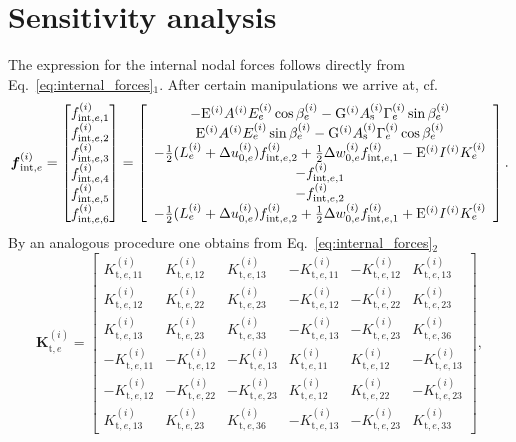 \documentclass[11pt]{article}
\newcommand{\Eref}[1]{Eq.~\eqref{#1}}
\newcommand{\M}[1]{{\boldsymbol #1}}
\newcommand{\lay}[1]{^{(#1)}}
\newcommand{\Duc}[2]{\Delta u_{0,#2}\lay{#1}}
\newcommand{\Dwc}[2]{\Delta w_{0,#2}\lay{#1}}
\newcommand{\Sc}[1]{E\lay{#1}}
\newcommand{\Kc}[1]{K\lay{#1}}
\newcommand{\Gc}[1]{\Gamma\lay{#1}}
\newcommand{\half}{\mbox{$\frac{1}{2}$}}
\newcommand{\E}[1]{\mathrm{E}\lay{#1}}\newcommand{\G}[1]{\mathrm{G}\lay{#1}}\newcommand{\A}[1]{A\lay{#1}}\newcommand{\I}[1]{I\lay{#1}}\newcommand{\As}[1]{A_\mathrm{s}\lay{#1}}
\newcommand{\el}{e}
\newcommand{\Mfinte}[1]{\M{f}_{\mathrm{int},#1}}
\newcommand{\finte}[1]{f_{\mathrm{int},#1}}
\newcommand{\Kt}[1]{K_{\mathrm{t},#1}}
\begin{document}
\appendix

\section{Sensitivity analysis}\label{app:sensitivity_analysis}

The expression for the internal nodal forces follows directly from
\Eref{eq:internal_forces}$_1$. After certain manipulations
we arrive at, cf.~\cite{Kucerova:2003:DEA}
\begin{equation}
\Mfinte{\el}\lay{i}
=
\begin{bmatrix}
\finte{e,1}\lay{i} \\
\finte{e,2}\lay{i} \\
\finte{e,3}\lay{i} \\
\finte{e,4}\lay{i} \\
\finte{e,5}\lay{i} \\
\finte{e,6}\lay{i} 
\end{bmatrix}
=
\left[
\begin{array}{c}
- \E{i} \A{i} \Sc{i}_\el \cos\beta\lay{i}_\el 
- \G{i} \As{i} \Gc{i}_\el \sin\beta\lay{i}_\el  \\
  \E{i} \A{i} \Sc{i}_\el \sin\beta\lay{i}_\el 
- \G{i} \As{i} \Gc{i}_\el \cos\beta\lay{i}_\el \\
- \half (\eL{\el}{i} + \Duc{i}{\el})
  \finte{e,2}\lay{i} 
+ \half \Dwc{i}{\el} \finte{e,1}\lay{i} 
- \E{i} \I{i} \Kc{i}_\el
\\ 
- \finte{e,1}\lay{i} \\
- \finte{e,2}\lay{i} \\
- \half (\eL{\el}{i} + \Duc{i}{\el} )
\finte{e,2}\lay{i} 
+ \half \Dwc{i}{\el}\finte{e,1}\lay{i} 
+ 
\E{i} \I{i} \Kc{i}_\el 
\end{array}
\right].
\label{eq:f_int_e}
\end{equation}
By an analogous procedure one obtains from \Eref{eq:internal_forces}$_2$ 
\begin{equation}
\M{K}_{\mathrm t, e}\lay{i} =
\left[
\begin{array}{rrrrrr}
 \Kt{e,11}\lay{i} &  \Kt{e,12}\lay{i} &  \Kt{e,13}\lay{i} & - \Kt{e,11}\lay{i} & - \Kt{e,12}\lay{i} &  \Kt{e,13}\lay{i} \\
 \Kt{e,12}\lay{i} &  \Kt{e,22}\lay{i} &  \Kt{e,23}\lay{i} & - \Kt{e,12}\lay{i} & - \Kt{e,22}\lay{i} &  \Kt{e,23}\lay{i} \\
 \Kt{e,13}\lay{i} &  \Kt{e,23}\lay{i} &  \Kt{e,33}\lay{i} & - \Kt{e,13}\lay{i} & - \Kt{e,23}\lay{i} &  \Kt{e,36}\lay{i} \\
-\Kt{e,11}\lay{i} & -\Kt{e,12}\lay{i} & -\Kt{e,13}\lay{i} &   \Kt{e,11}\lay{i} &   \Kt{e,12}\lay{i} & -\Kt{e,13}\lay{i} \\
-\Kt{e,12}\lay{i} & -\Kt{e,22}\lay{i} & -\Kt{e,23}\lay{i} &   \Kt{e,12}\lay{i} &   \Kt{e,22}\lay{i} & -\Kt{e,23}\lay{i} \\
 \Kt{e,13}\lay{i} &  \Kt{e,23}\lay{i} &  \Kt{e,36}\lay{i} & - \Kt{e,13}\lay{i} & - \Kt{e,23}\lay{i} &  \Kt{e,33}\lay{i} 
\end{array}
\right],
\label{eq:K_e}
\end{equation}
\end{document}
